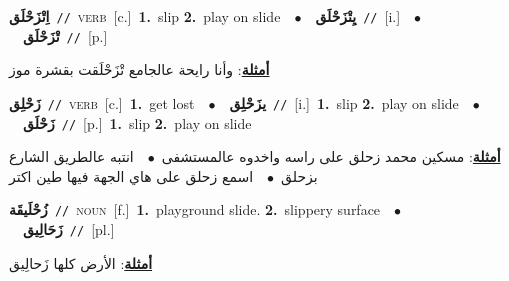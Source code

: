 \documentclass[10pt,a4paper,twoside]{article} %
\begin{document}
\begin{multicols}{2}
{{{{{{{{{\setlength\topsep{0pt}\textbf{\foreignlanguage{arabic}{اِتْزَحْلَق}}\ {\color{gray}\texttt{//}\color{black}}\ \textsc{verb}\ [c.]\ \textbf{1.}~slip  \textbf{2.}~play on slide\ \ $\bullet$\ \ \setlength\topsep{0pt}\textbf{\foreignlanguage{arabic}{يِتْزَحْلَق}}\ {\color{gray}\texttt{//}\color{black}}\ [i.]\ \ $\bullet$\ \ \setlength\topsep{0pt}\textbf{\foreignlanguage{arabic}{تْزَحْلَق}}\ {\color{gray}\texttt{//}\color{black}}\ [p.]\  \begin{flushright}\color{gray}\foreignlanguage{arabic}{\textbf{\underline{\foreignlanguage{arabic}{أمثلة}}}: وأنا رايحة عالجامع تْزَحْلَقت بقشرة موز}\end{flushright}\color{black}} \vspace{2mm}

{\setlength\topsep{0pt}\textbf{\foreignlanguage{arabic}{زَحْلِق}}\ {\color{gray}\texttt{//}\color{black}}\ \textsc{verb}\ [c.]\ \textbf{1.}~get lost\ \ $\bullet$\ \ \setlength\topsep{0pt}\textbf{\foreignlanguage{arabic}{يزَحْلِق}}\ {\color{gray}\texttt{//}\color{black}}\ [i.]\ \textbf{1.}~slip  \textbf{2.}~play on slide\ \ $\bullet$\ \ \setlength\topsep{0pt}\textbf{\foreignlanguage{arabic}{زَحْلَق}}\ {\color{gray}\texttt{//}\color{black}}\ [p.]\ \textbf{1.}~slip  \textbf{2.}~play on slide\  \begin{flushright}\color{gray}\foreignlanguage{arabic}{\textbf{\underline{\foreignlanguage{arabic}{أمثلة}}}: مسكين محمد زحلق على راسه واخدوه عالمستشفى\ $\bullet$\ \  انتبه عالطريق الشارع بزحلق\ $\bullet$\ \  اسمع زحلق على هاي الجهة فيها طين اكتر}\end{flushright}\color{black}} \vspace{2mm}

{\setlength\topsep{0pt}\textbf{\foreignlanguage{arabic}{زُحْلَيقَة}}\ {\color{gray}\texttt{//}\color{black}}\ \textsc{noun}\ [f.]\ \textbf{1.}~playground slide.  \textbf{2.}~slippery surface\ \ $\bullet$\ \ \setlength\topsep{0pt}\textbf{\foreignlanguage{arabic}{زَحَالِيق}}\ {\color{gray}\texttt{//}\color{black}}\ [pl.]\  \begin{flushright}\color{gray}\foreignlanguage{arabic}{\textbf{\underline{\foreignlanguage{arabic}{أمثلة}}}: الأرض كلها زَحالِيق}\end{flushright}\color{black}} \vspace{2mm}

}}}}}}}}
\end{multicols}
\end{document}
